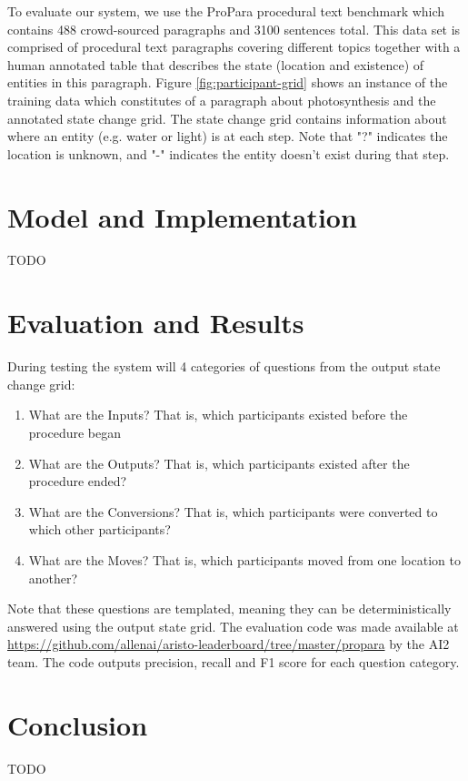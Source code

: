 \documentclass[11pt,a4paper]{article}
\begin{document}
To evaluate our system, we use the ProPara procedural text benchmark 
which contains 488 crowd-sourced paragraphs and 3100 sentences total. 
This data set is comprised of procedural text paragraphs covering different 
topics together with a human annotated table that describes the state 
(location and existence) of entities in this paragraph. Figure 
\ref{fig:participant-grid} shows an instance of the training data which 
constitutes of a paragraph about photosynthesis and the annotated state 
change grid. The state change grid contains information about where an 
entity (e.g. water or light) is at each step. Note that "?" indicates the 
location is unknown, and "-" indicates the entity doesn't exist during that step.

\section{Model and Implementation}

TODO

\section{Evaluation and Results}

During testing the system will 4 categories of questions from the output 
state change grid: 

\begin{enumerate}
  \item What are the Inputs? That is, which participants existed before the 
  	  procedure began
  \item What are the Outputs? That is, which participants existed after 
	  the procedure ended?
  \item What are the Conversions? That is, which participants were 
  	  converted to which other participants?
  \item What are the Moves? That is, which participants 
	   moved from one location to another?
\end{enumerate}

Note that these questions are templated, meaning they can be deterministically 
answered using the output state grid. The evaluation code was made available 
at \url{https://github.com/allenai/aristo-leaderboard/tree/master/propara} by 
the AI2 team. The code outputs precision, recall and F1 score for each 
question category.

\section{Conclusion}

TODO
\end{document}
